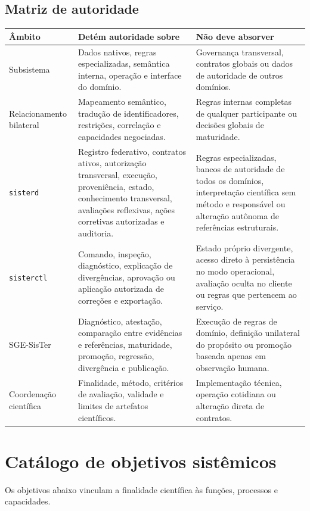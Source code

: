 \documentclass[11pt,a4paper,oneside]{article}
\begin{document}
\subsection{Matriz de autoridade}
\begin{longtable}{P{3.3cm}P{5.7cm}P{5.8cm}}
\toprule
\textbf{Âmbito} & \textbf{Detém autoridade sobre} & \textbf{Não deve absorver} \\
\midrule
\endhead
Subsistema & Dados nativos, regras especializadas, semântica interna, operação e interface do domínio. & Governança transversal, contratos globais ou dados de autoridade de outros domínios. \\
Relacionamento bilateral & Mapeamento semântico, tradução de identificadores, restrições, correlação e capacidades negociadas. & Regras internas completas de qualquer participante ou decisões globais de maturidade. \\
\texttt{sisterd} & Registro federativo, contratos ativos, autorização transversal, execução, proveniência, estado, conhecimento transversal, avaliações reflexivas, ações corretivas autorizadas e auditoria. & Regras especializadas, bancos de autoridade de todos os domínios, interpretação científica sem método e responsável ou alteração autônoma de referências estruturais. \\
\texttt{sisterctl} & Comando, inspeção, diagnóstico, explicação de divergências, aprovação ou aplicação autorizada de correções e exportação. & Estado próprio divergente, acesso direto à persistência no modo operacional, avaliação oculta no cliente ou regras que pertencem ao serviço. \\
SGE-SisTer & Diagnóstico, atestação, comparação entre evidências e referências, maturidade, promoção, regressão, divergência e publicação. & Execução de regras de domínio, definição unilateral do propósito ou promoção baseada apenas em observação humana. \\
Coordenação científica & Finalidade, método, critérios de avaliação, validade e limites de artefatos científicos. & Implementação técnica, operação cotidiana ou alteração direta de contratos. \\
\bottomrule
\end{longtable}

\section{Catálogo de objetivos sistêmicos}

Os objetivos abaixo vinculam a finalidade científica às funções, processos e capacidades.
\end{document}
